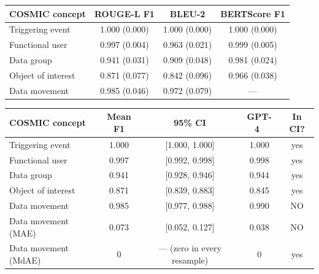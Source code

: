 \begin{tabular}{@{}lccc@{}}
\toprule
COSMIC concept & ROUGE-L F1 & BLEU-2 & BERTScore F1 \\
\midrule
Triggering event   & 1.000 (0.000) & 1.000 (0.000) & 1.000 (0.000) \\
Functional user    & 0.997 (0.004) & 0.963 (0.021) & 0.999 (0.005) \\
Data group         & 0.941 (0.031) & 0.909 (0.048) & 0.981 (0.024) \\
Object of interest & 0.871 (0.077) & 0.842 (0.096) & 0.966 (0.038) \\
Data movement      & 0.985 (0.046) & 0.972 (0.079) & --- \\
\bottomrule
\end{tabular}

\begin{tabular}{@{}lcccc@{}}
\toprule
COSMIC concept & Mean F1 & 95\% CI & GPT-4~\cite{cosmet} & In CI? \\
\midrule
Triggering event   & 1.000 & [1.000, 1.000] & 1.000 & yes \\
Functional user    & 0.997 & [0.992, 0.998] & 0.998 & yes \\
Data group         & 0.941 & [0.928, 0.946] & 0.944 & yes \\
Object of interest & 0.871 & [0.839, 0.883] & 0.845 & yes \\
Data movement      & 0.985 & [0.977, 0.988] & 0.990 & NO \\
\midrule
Data movement (MAE) & 0.073 & [0.052, 0.127] & 0.038 & NO \\
Data movement (MdAE) & 0 & --- (zero in every resample) & 0 & yes \\
\bottomrule
\end{tabular}

